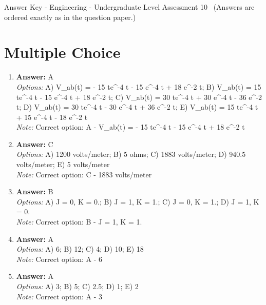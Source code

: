 \documentclass[12pt]{article}
\begin{document}
\begin{center}
Answer Key - Engineering - Undergraduate Level Assessment 10 \
\small (Answers are ordered exactly as in the question paper.)
\end{center}

\section*{Multiple Choice}
\begin{enumerate}[label=\arabic*.]
\item \textbf{Answer:} A
\\ \textit{Options:} A) V\_ab(t) = - 15 te^-4 t - 15 e^-4 t + 18 e^-2 t; B) V\_ab(t) = 15 te^-4 t - 15 e^-4 t + 18 e^-2 t; C) V\_ab(t) = 30 te^-4 t + 30 e^-4 t - 36 e^-2 t; D) V\_ab(t) = 30 te^-4 t - 30 e^-4 t + 36 e^-2 t; E) V\_ab(t) = 15 te^-4 t + 15 e^-4 t - 18 e^-2 t
\\ \textit{Note:} Correct option: A - V\_ab(t) = - 15 te^-4 t - 15 e^-4 t + 18 e^-2 t
\item \textbf{Answer:} C
\\ \textit{Options:} A) 1200 volts/meter; B) 5 ohms; C) 1883 volts/meter; D) 940.5 volts/meter; E) 5 volts/meter
\\ \textit{Note:} Correct option: C - 1883 volts/meter
\item \textbf{Answer:} B
\\ \textit{Options:} A) J = 0, K = 0.; B) J = 1, K = 1.; C) J = 0, K = 1.; D) J = 1, K = 0.
\\ \textit{Note:} Correct option: B - J = 1, K = 1.
\item \textbf{Answer:} A
\\ \textit{Options:} A) 6; B) 12; C) 4; D) 10; E) 18
\\ \textit{Note:} Correct option: A - 6
\item \textbf{Answer:} A
\\ \textit{Options:} A) 3; B) 5; C) 2.5; D) 1; E) 2
\\ \textit{Note:} Correct option: A - 3
\end{enumerate}
\end{document}
